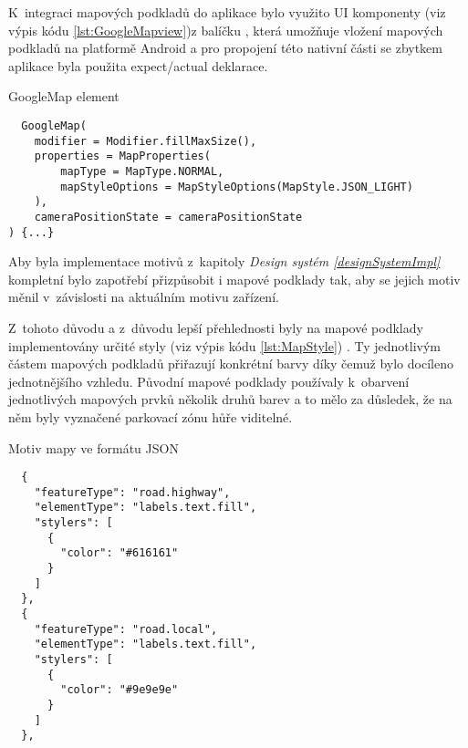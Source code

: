 K~integraci mapových podkladů do aplikace bylo využito UI komponenty  (viz výpis kódu \ref{lst:GoogleMapview})z balíčku 
, která umožňuje vložení mapových podkladů na platformě Android a pro propojení této nativní části 
se zbytkem aplikace byla použita expect/actual deklarace.


\begin{listing}[H]
\caption{GoogleMap element}\label{lst:GoogleMapview}
\begin{verbatim}
  GoogleMap(
    modifier = Modifier.fillMaxSize(),
    properties = MapProperties(
        mapType = MapType.NORMAL,
        mapStyleOptions = MapStyleOptions(MapStyle.JSON_LIGHT)
    ),
    cameraPositionState = cameraPositionState
) {...}
\end{verbatim}
\end{listing}


Aby byla implementace motivů z~kapitoly \textit{Design systém \ref{designSystemImpl}} kompletní bylo zapotřebí přizpůsobit i mapové podklady tak,
aby se jejich motiv měnil v~závislosti na aktuálním motivu zařízení.

Z~tohoto důvodu a z~důvodu lepší přehlednosti byly na mapové podklady implementovány určité styly (viz výpis kódu \ref{lst:MapStyle}) \cite{googleStyles}.
Ty jednotlivým částem mapových podkladů přiřazují konkrétní barvy díky čemuž bylo docíleno jednotnějšího vzhledu. Původní mapové podklady
používaly k~obarvení jednotlivých mapových prvků několik druhů barev a to mělo za důsledek, že na něm byly vyznačené parkovací zónu hůře viditelné.

\begin{listing}[H]
\caption{Motiv mapy ve formátu JSON}\label{lst:MapStyle}
\begin{verbatim}
  {
    "featureType": "road.highway",
    "elementType": "labels.text.fill",
    "stylers": [
      {
        "color": "#616161"
      }
    ]
  },
  {
    "featureType": "road.local",
    "elementType": "labels.text.fill",
    "stylers": [
      {
        "color": "#9e9e9e"
      }
    ]
  },
\end{verbatim}
\end{listing}

